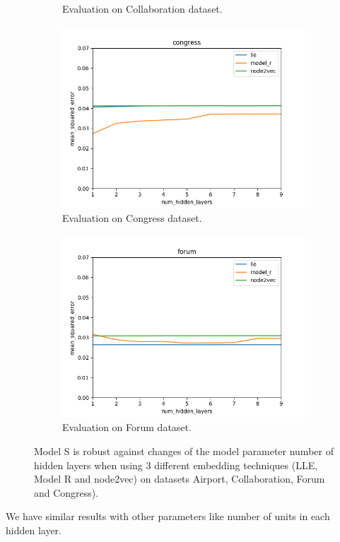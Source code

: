 \documentclass[12pt]{WSUThesis}
\theoremstyle{definition}
\begin{document}
\begin{figure}[ht]
\begin{subfigure}{0.49 \linewidth}
		\caption{Evaluation on Collaboration dataset.}
	\end{subfigure}
	\begin{subfigure}{0.49 \linewidth}
		\includegraphics[width=\linewidth]{num_hidden_layers_congress}
		\caption{Evaluation on Congress dataset.}
	\end{subfigure}
	\begin{subfigure}{0.49 \linewidth}
		\includegraphics[width=\linewidth]{num_hidden_layers_forum}
		\caption{Evaluation on Forum dataset.}
	\end{subfigure}
	\caption{
		Model S is robust against changes of the model parameter number of hidden layers when using 3 different embedding techniques (LLE, Model R and node2vec) on datasets Airport, Collaboration, Forum and Congress).
	}
	\label{fig:robust-num-hidden-layers}
\end{figure}
We have similar results with other parameters like number of units in each hidden layer.
\end{document}
